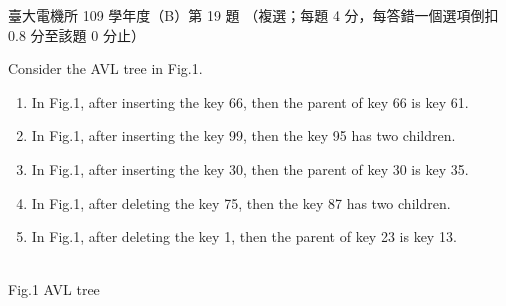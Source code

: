 \begin{pastexam}[label={px:ntu-109-ee-ds-19}]{臺大電機所 109 學年度（B）第 19 題}
（複選；每題 4 分，每答錯一個選項倒扣 0.8 分至該題 0 分止）

Consider the AVL tree in Fig.1.
\begin{enumerate}[label=(\Alph*)]
\item In Fig.1, after inserting the key 66, then the parent of key 66 is key 61.
\item In Fig.1, after inserting the key 99, then the key 95 has two children.
\item In Fig.1, after inserting the key 30, then the parent of key 30 is key 35.
\item In Fig.1, after deleting the key 75, then the key 87 has two children.
\item In Fig.1, after deleting the key 1, then the parent of key 23 is key 13.
\end{enumerate}

\begin{center}
\\ Fig.1 AVL tree
\end{center}
\end{pastexam}

